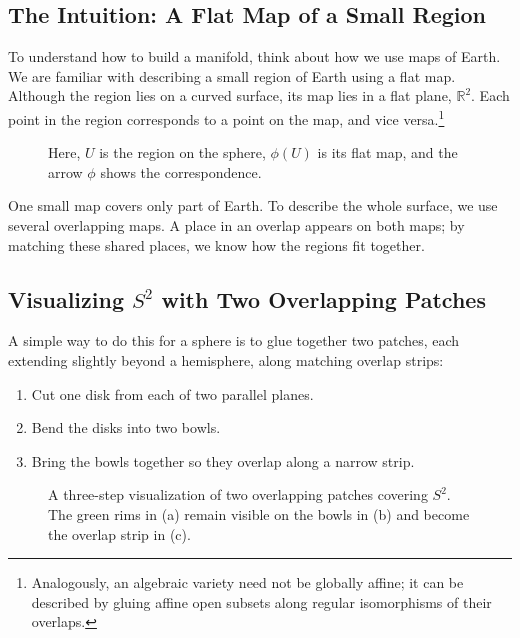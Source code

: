     \subsection{The Intuition: A Flat Map of a Small Region}
    To understand how to build a manifold, think about how we use maps of Earth.
    We are familiar with describing a small region of Earth using a flat map.
    Although the region lies on a curved surface, its map lies in a flat plane,
    $\mathbb{R}^2$. Each point in the region corresponds to a point on the map,
    and vice versa.\footnote{%
        Analogously, an algebraic variety need not be globally affine; it can
        be described by gluing affine open subsets along regular isomorphisms
        of their overlaps.}

    \begin{figure}[htbp]
        \centering
        
        \caption{%
            Here, $U$ is the region on the sphere, $\phi(U)$ is its flat map,
            and the arrow $\phi$ shows the correspondence.
        }
        \label{fig:sphere_chart}
    \end{figure}

    One small map covers only part of Earth. To describe the whole surface,
    we use several overlapping maps. A place in an overlap appears on both
    maps; by matching these shared places, we know how the regions fit together.

    \subsection{Visualizing \texorpdfstring{$S^2$}{S²} with Two Overlapping Patches}
    \label{sec:gluing_s2}

    A simple way to do this for a sphere is to glue together two patches,
    each extending slightly beyond a hemisphere, along matching overlap strips:
    \begin{enumerate}
        \item Cut one disk from each of two parallel planes.
        \item Bend the disks into two bowls.
        \item Bring the bowls together so they overlap along a narrow strip.
    \end{enumerate}

    \begin{figure}[htbp]
        \centering
        
        \caption{%
            A three-step visualization of two overlapping patches covering
            $S^2$. The green rims in (a) remain visible on the bowls in (b)
            and become the overlap strip in (c).
        }
        \label{fig:sphere_gluing}
    \end{figure}

